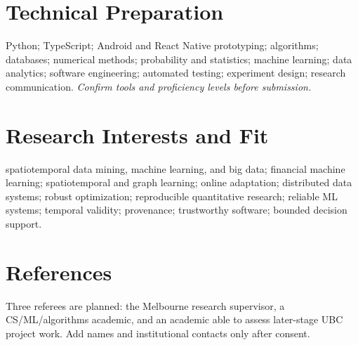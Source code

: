 \documentclass[11pt]{article}
\begin{document}
\section*{Technical Preparation}
Python; TypeScript; Android and React Native prototyping; algorithms; databases; numerical methods; probability and statistics; machine learning; data analytics; software engineering; automated testing; experiment design; research communication. \textit{Confirm tools and proficiency levels before submission.}

\section*{Research Interests and Fit}
spatiotemporal data mining, machine learning, and big data; financial machine learning; spatiotemporal and graph learning; online adaptation; distributed data systems; robust optimization; reproducible quantitative research; reliable ML systems; temporal validity; provenance; trustworthy software; bounded decision support.

\section*{References}
Three referees are planned: the Melbourne research supervisor, a CS/ML/algorithms academic, and an academic able to assess later-stage UBC project work. Add names and institutional contacts only after consent.
\end{document}
